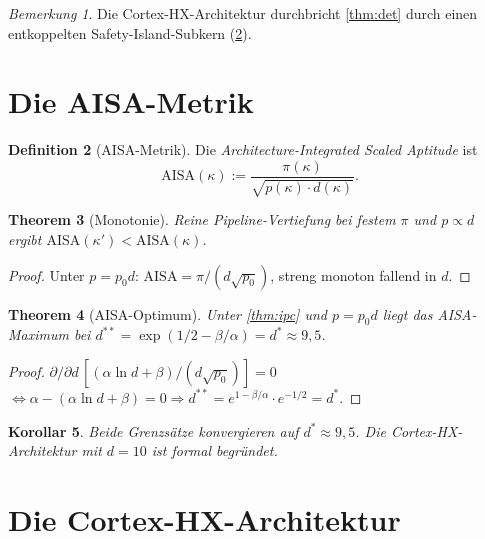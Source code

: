 ﻿\documentclass[a4paper,12pt]{article}
\theoremstyle{plain}
\newtheorem{theorem}{Theorem}[section]
\newtheorem{corollary}[theorem]{Korollar}
\theoremstyle{definition}
\newtheorem{definition}[theorem]{Definition}
\theoremstyle{remark}
\newtheorem{remark}[theorem]{Bemerkung}
\begin{document}
\begin{remark}
Die Cortex-HX-Architektur durchbricht \cref{thm:det} durch einen
entkoppelten Safety-Island-Subkern (\cref{sec:hx}).
\end{remark}

\section{Die AISA-Metrik}\label{sec:aisa}

\begin{definition}[AISA-Metrik]\label{def:aisa}
Die \emph{Architecture-Integrated Scaled Aptitude} ist
\[
  \mathrm{AISA}(\kappa):=\frac{\pi(\kappa)}{\sqrt{p(\kappa)\cdot d(\kappa)}}.
\]
\end{definition}

\begin{theorem}[Monotonie]\label{thm:aisa}
Reine Pipeline-Vertiefung bei festem $\pi$ und $p\propto d$ ergibt
$\mathrm{AISA}(\kappa')<\mathrm{AISA}(\kappa)$.
\end{theorem}
\begin{proof}
Unter $p=p_0 d$: $\mathrm{AISA}=\pi/(d\sqrt{p_0})$, streng monoton fallend in $d$.
\end{proof}

\begin{theorem}[AISA-Optimum]\label{thm:aisa_opt}
Unter \cref{thm:ipc} und $p=p_0 d$ liegt das AISA-Maximum bei
$d^{**}=\exp(1/2-\beta/\alpha)=d^*\approx9{,}5$.
\end{theorem}
\begin{proof}
$\partial/\partial d\,[(\alpha\ln d+\beta)/(d\sqrt{p_0})]=0$
$\Leftrightarrow\alpha-(\alpha\ln d+\beta)=0
\Rightarrow d^{**}=e^{1-\beta/\alpha}\cdot e^{-1/2}=d^*$.
\end{proof}

\begin{corollary}
Beide Grenzs\"atze konvergieren auf $d^*\approx9{,}5$.
Die Cortex-HX-Architektur mit $d=10$ ist formal begr\"undet.
\end{corollary}

\section{Die Cortex-HX-Architektur}\label{sec:hx}
\end{document}
